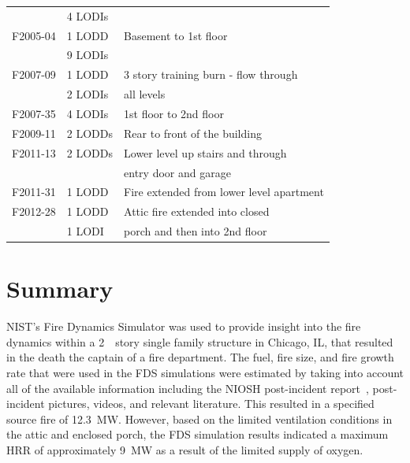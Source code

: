 \documentclass[12pt,oneside]{book}
\begin{document}
\begin{table}
\begin{tabular}{lll}
                                    &  4 LODIs            &                                                       \\
F2005-04 \cite{NIOSH:McFall4}       &  1 LODD             &  Basement to 1st floor                                \\
                                    &  9 LODIs            &                                                       \\
F2007-09 \cite{NIOSH:Tarley}        &  1 LODD             &  3 story training burn - flow through                 \\
                                    &  2 LODIs            &  all levels                                           \\
F2007-35 \cite{NIOSH:Braddee}       &  4 LODIs            &  1st floor to 2nd floor                               \\
F2009-11 \cite{NIOSH:Merinar}       &  2 LODDs            &  Rear to front of the building                        \\
F2011-13 \cite{NIOSH:Bowyer2}       &  2 LODDs            &  Lower level up stairs and through                    \\
                                    &                     &  entry door and garage                                \\
F2011-31 \cite{NIOSH:Loflin}        &  1 LODD             &  Fire extended from lower level apartment             \\
F2012-28 \cite{NIOSH:Bowyer}        &  1 LODD             &  Attic fire extended into closed                      \\
                                    &  1 LODI             &  porch and then into 2nd floor                        \\
\bottomrule[1.25pt]
\end{tabular}\par
\end{table}

\chapter{Summary}
NIST's Fire Dynamics Simulator was used to provide insight into the fire dynamics within a 2~~story single family structure in Chicago, IL, that resulted in the death the captain of a fire department. The fuel, fire size, and fire growth rate that were used in the FDS simulations were estimated by taking into account all of the available information including the NIOSH post-incident report~\cite{NIOSH:Bowyer}, post-incident pictures, videos, and relevant literature. This resulted in a specified source fire of 12.3~MW. However, based on the limited ventilation conditions in the attic and enclosed porch, the FDS simulation results indicated a maximum HRR of approximately 9~MW as a result of the limited supply of oxygen.
\end{document}
